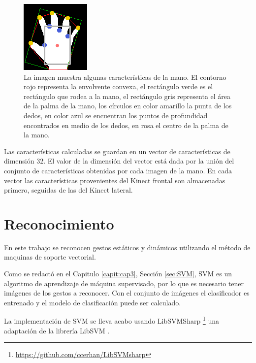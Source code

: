 \begin{figure}[h!]
\begin{center} 
\includegraphics[scale=1]{./Figures/250_Dedos.png}
\end{center}
\caption{La imagen muestra algunas características de la mano. El contorno rojo representa la envolvente convexa, el rectángulo verde es el rectángulo que rodea a la mano, el rectángulo gris representa el área de la palma de la mano, los círculos en color amarillo la punta de los dedos, en color azul se encuentran los puntos de profundidad encontrados en medio de los dedos, en rosa el centro de la palma de la mano.}
\label{fig:FeaturesOfHand}
\end{figure}

Las características calculadas se guardan en un vector de características de dimensión $32$. El valor de la dimensi\'on del vector est\'a dada por la unión del conjunto de características obtenidas por cada imagen de la mano. En cada vector las características provenientes del Kinect frontal son almacenadas primero, seguidas de las del Kinect lateral.





\section{Reconocimiento}\label{sec:ReconocimientoSystem}

En este trabajo se reconocen gestos estáticos y dinámicos utilizando el método de maquinas de soporte vectorial.  

Como se redact\'o en el Capitulo \ref{capit:cap3}, Sección \ref{sec:SVM}, SVM es un algoritmo de aprendizaje de máquina supervisado, por lo que es necesario tener imágenes de los gestos a reconocer. Con el conjunto de imágenes el clasificador es entrenado y el modelo de clasificación puede ser calculado. 

La implementación de SVM se lleva acabo usando LibSVMSharp \footnote{\url{https://github.com/ccerhan/LibSVMsharp}} una adaptación de la librería LibSVM \citep{Chang2011}.


